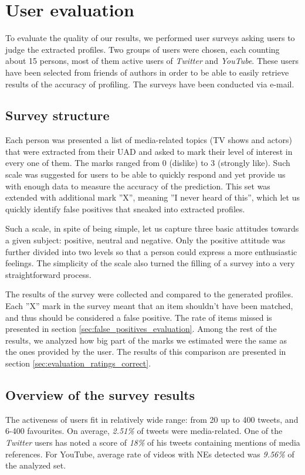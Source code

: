 \section{User evaluation}
\label{sec:evaluation}

To evaluate the quality of our results, we performed user surveys
asking users to judge the extracted profiles. Two groups of users were chosen,
each counting about 15 persons, most of them active users of \textit{Twitter} and \textit{YouTube}.
These users have been selected from friends of authors in order to be able to easily
retrieve results of the accuracy of profiling. The surveys have been conducted via
e-mail.

\subsection{Survey structure}

Each person was presented a list of media-related topics (TV shows and actors) 
that were extracted from their UAD and asked to mark their level of interest in every one of
them. The marks ranged from 0 (dislike) to 3 (strongly like).
Such scale was suggested for users to be able to quickly respond
and yet provide us with enough data to measure the accuracy of the prediction.
This set was extended with additional mark ''X'', meaning
''I never heard of this'', which let us quickly identify false positives that
sneaked into extracted profiles.

Such a scale, in spite of being simple, let us capture three basic attitudes
towards a given subject: positive, neutral and negative. Only the positive
attitude was further divided into two levels so that a person could express a
more enthusiastic feelings. The simplicity of the scale also turned the filling
of a survey into a very straightforward process.

The results of the survey were collected and compared to the generated profiles.
Each ''X'' mark in the survey meant that an item shouldn't have been matched,
and thus should be considered a false positive. The rate of items missed is
presented in section \ref{sec:false_positives_evaluation}. Among the rest of the results,
we analyzed how big part of the marks we estimated were the same as the ones provided by the user.
The results of this comparison are presented in section \ref{sec:evaluation_ratings_correct}.

\subsection{Overview of the survey results}
The activeness of users fit in relatively wide range: from 20 up to 400 tweets,
and 6-400 favourites. On average, \textit{2.51\%} of tweets were media-related.
One of the \textit{Twitter} users has noted a score of \textit{18\%} of his
tweets containing mentions of media references. For YouTube, average rate of
videos with NEs detected was \textit{9.56\%} of the analyzed set.

